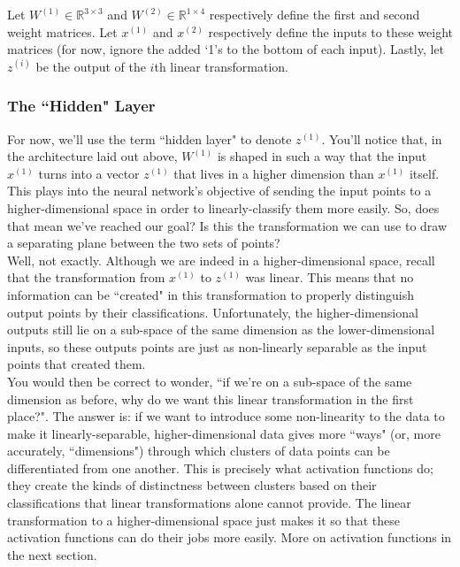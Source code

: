 \documentclass{article}
\begin{document}
Let $W^{(1)} \in \mathbb{R}^{3 \times 3}$ and $W^{(2)}\in \mathbb{R}^{1 \times 4}$ respectively define the first and second weight matrices. Let $x^{(1)}$ and $x^{(2)}$ respectively define the inputs to these weight matrices (for now, ignore the added `1's to the bottom of each input). Lastly, let $z^{(i)}$ be the output of the $i$th linear transformation.

\subsubsection{The ``Hidden" Layer}
For now, we'll use the term ``hidden layer" to denote $z^{(1)}$. You'll notice that, in the architecture laid out above, $W^{(1)}$ is shaped in such a way that the input $x^{(1)}$ turns into a vector $z^{(1)}$ that lives in a higher dimension than $x^{(1)}$ itself.  \\

This plays into the neural network's objective of sending the input points to a higher-dimensional space in order to linearly-classify them more easily. So, does that mean we've reached our goal? Is this the transformation we can use to draw a separating plane between the two sets of points? \\

Well, not exactly. Although we are indeed in a higher-dimensional space, recall that the transformation from $x^{(1)}$ to $z^{(1)}$ was linear. This means that no information can be ``created" in this transformation to properly distinguish output points by their classifications. Unfortunately, the higher-dimensional outputs still lie on a sub-space of the same dimension as the lower-dimensional inputs, so these outputs points are just as non-linearly separable as the input points that created them. \\

You would then be correct to wonder, ``if we're on a sub-space of the same dimension as before, why do we want this linear transformation in the first place?". The answer is: if we want to introduce some non-linearity to the data to make it linearly-separable, higher-dimensional data gives more ``ways" (or, more accurately, ``dimensions") through which clusters of data points can be differentiated from one another. This is precisely what activation functions do; they create the kinds of distinctness between clusters based on their classifications that linear transformations alone cannot provide. The linear transformation to a higher-dimensional space just makes it so that these activation functions can do their jobs more easily. More on activation functions in the next section.
\end{document}
